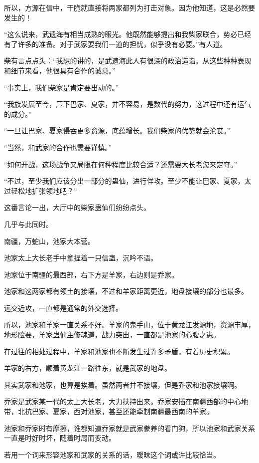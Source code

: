 \begin{this_body}
所以，方源在信中，干脆就直接将两家都列为打击对象。因为他知道，这是必然要发生的！

“这么说来，武遗海有相当成熟的眼光。他既然能够提出和我柴家联合，势必已经有了许多的准备。对于武家耍我们一道的担忧，似乎没有必要。”有人道。

柴有言点点头：“我想的讲的，是武遗海此人有很深的政治造诣。从这些种种表现和细节来看，他很具有合作的诚意。”

“事实上，我们柴家是肯定要出动的。”

“我族发展至今，压下巴家、夏家，并不容易，是数代的努力，这过程中还有运气的成分。”

“一旦让巴家、夏家侵吞更多资源，底蕴增长。我们柴家的优势就会沦丧。”

“当然，和武家的合作也需要谨慎。”

“如何开战，这场战争又局限在何种程度比较合适？还需要大长老您来定夺。”

“不过，至少我们应该分出一部分的蛊仙，进行佯攻。至少不能让巴家、夏家，太过轻松地扩张领地吧？”

这番言论一出，大厅中的柴家蛊仙们纷纷点头。

几乎与此同时。

南疆，万蛇山，池家大本营。

池家太上大长老手中拿捏着一只信蛊，沉吟不语。

池家位于南疆的最西部，右下方是羊家，右边则是乔家。

池家和这两家都有领土的接壤，不过和羊家距离更近，地盘接壤的部分也最多。

远交近攻，一直都是通常的外交选择。

所以，池家和羊家一直关系不好。羊家的鬼手山，位于黄龙江发源地，资源丰厚，地形险要，羊家蛊仙主修魂道，战力突出，一直都是池家的心腹之患。

在过往的相处过程中，羊家和池家也不断发生过许多矛盾，有着历史积累。

羊家的右方，顺着黄龙江一路往东，就是武家的地盘。

其实武家和池家，也算是挨着。虽然两者并不接壤，但是乔家和池家接壤啊。

乔家是武家某一代的太上大长老，大力扶持出来。乔家安插在南疆西部的中心地带，北抗巴家、夏家，西对池家，甚至还能牵制南疆最西南的羊家。

池家和乔家时有摩擦，谁都知道乔家就是武家豢养的看门狗，所以池家和武家关系一直是时好时坏，随着时局而变动。

若用一个词来形容池家和武家的关系的话，暧昧这个词或许比较恰当。


\end{this_body}
